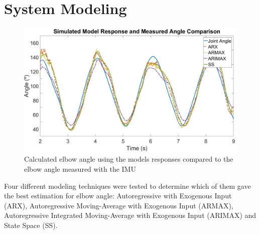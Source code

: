 \documentclass[letterpaper, 10 pt, conference]{ieeeconf}  %
\begin{document}
\section{System Modeling}

\begin{figure}[thpb]
      \centering
      \includegraphics[width=0.95\columnwidth]{Images/simulated_response.jpg}
      \caption{Calculated elbow angle using the models responses compared to the elbow angle measured with the IMU}
      \label{Models Comparison}
   \end{figure}


% 
% 
% 





Four different modeling techniques were tested to determine which of them gave the best estimation for elbow angle: Autoregressive with Exogenous Input (ARX), Autoregressive Moving-Average with Exogenous Input (ARMAX), Autoregressive Integrated Moving-Average with Exogenous Input (ARIMAX) and State Space (SS).
\end{document}
